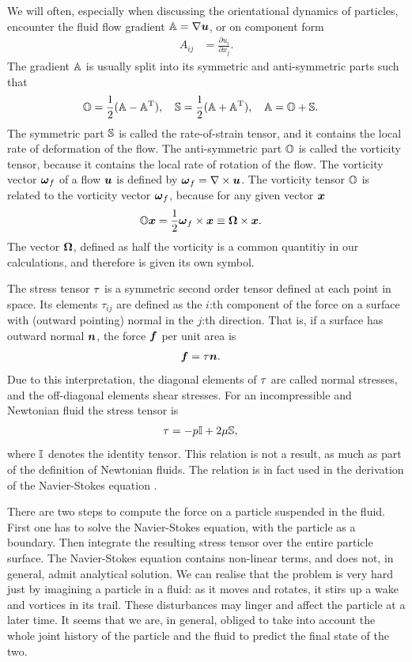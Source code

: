 \documentclass[thesis.tex]{subfiles}
\begin{document}
We will often, especially when discussing the orientational dynamics of particles, encounter the fluid flow gradient $\mathbb{A} = \nabla \mbox{\boldmath$u$}$, or on component form
\begin{align*}
	A_{ij} &= \frac{\partial u_i}{\partial x_j}.
\end{align*}
The gradient $\mathbb{A}$ is usually split into its symmetric and anti-symmetric parts such that
\begin{align*}
	&\mathbb{O} = \frac{1}{2}(\mathbb{A} - \mathbb{A}^{\mathrm T}),\quad
	\mathbb{S} = \frac{1}{2}(\mathbb{A} + \mathbb{A}^{\mathrm T}),\quad
	\mathbb{A} = \mathbb{O} + \mathbb{S}.
\end{align*}
The symmetric part $\mathbb{S}$ is called the rate-of-strain tensor, and it contains the local rate of deformation of the flow. The anti-symmetric part $\mathbb{O}$ is called the vorticity tensor, because it contains the local rate of rotation of the flow. The vorticity vector $\mbox{\boldmath$\omega$}_f$ of a flow $\mbox{\boldmath$u$}$ is defined by $\mbox{\boldmath$\omega$}_f = \nabla \times \mbox{\boldmath$u$}$. The vorticity tensor $\mathbb{O}$ is related to the vorticity vector $\mbox{\boldmath$\omega$}_f$, because for any given vector $\mbox{\boldmath$x$}$
\begin{align*}
	\mathbb{O} \mbox{\boldmath$x$} &= \frac{1}{2}\mbox{\boldmath$\omega$}_f \times \mbox{\boldmath$x$} \equiv \mbox{\boldmath$\Omega$} \times \mbox{\boldmath$x$}.
\end{align*}
The vector $\mbox{\boldmath$\Omega$}$, defined as half the vorticity is a common quantitiy in our calculations, and therefore is given its own symbol. 

The stress tensor $\mathbb{\tau}$ is a symmetric second order tensor defined at each point in space. Its elements $\tau_{ij}$ are defined as the $i$:th component of the force on a surface with (outward pointing) normal in the $j$:th direction. That is, if a surface has outward normal $\mbox{\boldmath$n$}$, the force $\mbox{\boldmath$f$}$ per unit area is
\begin{align*}
	\mbox{\boldmath$f$} &= \mathbb{\tau} \mbox{\boldmath$n$}.
\end{align*}
Due to this interpretation, the diagonal elements of $\mathbb{\tau}$ are called normal stresses, and the off-diagonal elements shear stresses. For an incompressible and Newtonian fluid the stress tensor is
\begin{align*}
	\mathbb{\tau} &= -p \mathbb{I} + 2\mu \mathbb{S},
\end{align*}
where $\mathbb{I}$ denotes the identity tensor. This relation is not a result, as much as part of the definition of Newtonian fluids. The relation is in fact used in the derivation of the Navier-Stokes equation . 

There are two steps to compute the force on a particle suspended in the fluid. First one has to solve the Navier-Stokes equation, with the particle as a boundary. Then integrate the resulting stress tensor over the entire particle surface. The Navier-Stokes equation  contains non-linear terms, and does not, in general, admit analytical solution. We can realise that the problem is very hard just by imagining a particle in a fluid: as it moves and rotates, it stirs up a wake and vortices in its trail. These disturbances may linger and affect the particle at a later time. It seems that we are, in general, obliged to take into account the whole joint history of the particle and the fluid to predict the final state of the two.
\end{document}

